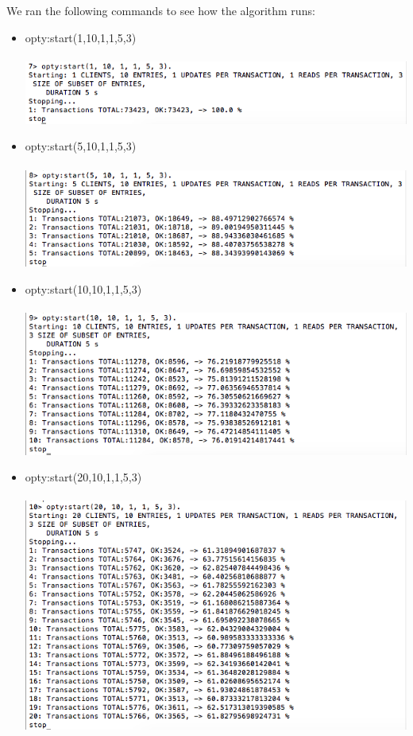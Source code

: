 \documentclass[a4paper, 11pt]{article}
\begin{document}
We ran the following commands to see how the algorithm runs:
\begin{itemize}
\item opty:start(1,10,1,1,5,3)\\\\
\includegraphics[scale=0.5]{images/exp-i-1.png} \\
\item opty:start(5,10,1,1,5,3)\\\\
\includegraphics[scale=0.5]{images/exp-i-2.png} \\
\item opty:start(10,10,1,1,5,3)\\\\
\includegraphics[scale=0.5]{images/exp-i-3.png} \\
\item opty:start(20,10,1,1,5,3)\\\\
\includegraphics[scale=0.5]{images/exp-i-4.png} \\

\end{itemize}
\end{document}
